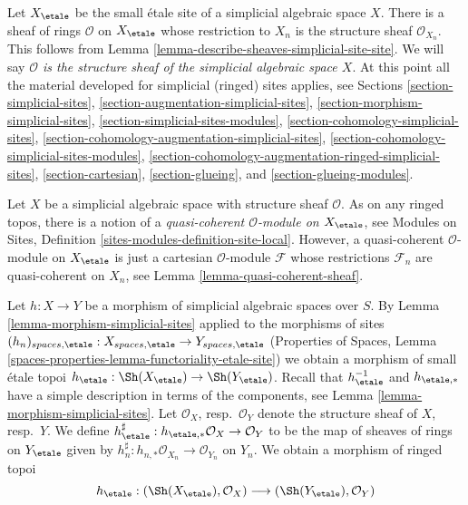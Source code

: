 \medskip\noindent
Let $X_\etale$ be the small \'etale site of a simplicial algebraic space $X$.
There is a sheaf of rings $\mathcal{O}$ on $X_\etale$ whose restriction
to $X_n$ is the structure sheaf $\mathcal{O}_{X_n}$. This follows from
Lemma \ref{lemma-describe-sheaves-simplicial-site-site}. We will say
{\it $\mathcal{O}$ is the structure sheaf of the
simplicial algebraic space $X$}.
At this point all the material developed for simplicial (ringed) sites
applies, see Sections \ref{section-simplicial-sites},
\ref{section-augmentation-simplicial-sites},
\ref{section-morphism-simplicial-sites},
\ref{section-simplicial-sites-modules},
\ref{section-cohomology-simplicial-sites},
\ref{section-cohomology-augmentation-simplicial-sites},
\ref{section-cohomology-simplicial-sites-modules},
\ref{section-cohomology-augmentation-ringed-simplicial-sites},
\ref{section-cartesian},
\ref{section-glueing}, and
\ref{section-glueing-modules}.

\medskip\noindent
Let $X$ be a simplicial algebraic space with structure sheaf $\mathcal{O}$.
As on any ringed topos, there is a notion
of a {\it quasi-coherent $\mathcal{O}$-module on $X_\etale$}, see
Modules on Sites, Definition \ref{sites-modules-definition-site-local}.
However, a quasi-coherent $\mathcal{O}$-module on $X_\etale$ is
just a cartesian $\mathcal{O}$-module $\mathcal{F}$ whose restrictions
$\mathcal{F}_n$ are quasi-coherent on $X_n$, see
Lemma \ref{lemma-quasi-coherent-sheaf}.

\medskip\noindent
Let $h : X \to Y$ be a morphism of simplicial algebraic spaces over $S$.
By Lemma \ref{lemma-morphism-simplicial-sites} applied to the morphisms
of sites $(h_n)_{spaces, \etale} : X_{spaces, \etale} \to Y_{spaces, \etale}$
(Properties of Spaces, Lemma
\ref{spaces-properties-lemma-functoriality-etale-site})
we obtain a morphism of small \'etale topoi
$h_\etale : \Sh(X_\etale) \to \Sh(Y_\etale)$.
Recall that $h_\etale^{-1}$ and $h_{\etale, *}$ have a simple
description in terms of the components, see
Lemma \ref{lemma-morphism-simplicial-sites}.
Let $\mathcal{O}_X$, resp.\ $\mathcal{O}_Y$ denote the structure
sheaf of $X$, resp.\ $Y$. We define
$h_\etale^\sharp : h_{\etale, *}\mathcal{O}_X \to \mathcal{O}_Y$
to be the map of sheaves of rings on $Y_\etale$ given by
$h_n^\sharp : h_{n, *}\mathcal{O}_{X_n} \to \mathcal{O}_{Y_n}$ on $Y_n$.
We obtain a morphism of ringed topoi
$$
h_\etale :
(\Sh(X_\etale), \mathcal{O}_X)
\longrightarrow
(\Sh(Y_\etale), \mathcal{O}_Y)
$$

